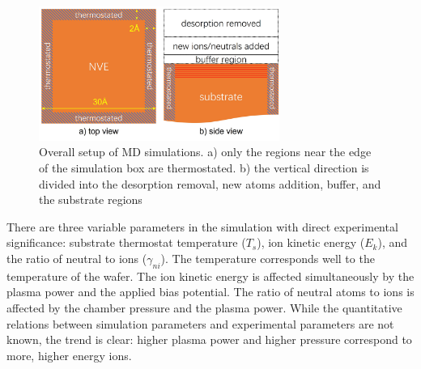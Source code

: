 \documentclass[manuscript=cmatex]{achemso}
\begin{document}
\begin{figure}[h]
  \centering
  \includegraphics[width=0.7\textwidth]{mdsetup}
  \caption[Overall setup of MD simulations]{Overall setup of MD simulations. a) only the regions near the edge of the simulation box are thermostated. b) the vertical direction is divided into the desorption removal, new atoms addition, buffer, and the substrate regions}
  \label{fig:md_setup}
\end{figure}
There are three variable parameters in the simulation with direct experimental significance: substrate thermostat temperature ($T_s$), ion kinetic energy ($E_k$), and the ratio of neutral to ions ($\gamma_{ni}$). The temperature corresponds well to the temperature of the wafer. The ion kinetic energy is affected simultaneously by the plasma power and the applied bias potential. The ratio of neutral atoms to ions is affected by the chamber pressure and the plasma power. While the quantitative relations between simulation parameters and experimental parameters are not known, the trend is clear: higher plasma power and higher pressure correspond to more, higher energy ions. 
\end{document}
